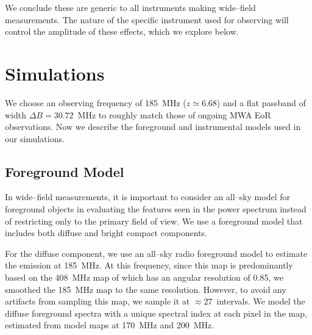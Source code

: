 \documentclass[preprint2,iop,numberedappendix]{emulateapj}
\begin{document}
We conclude these are generic to all instruments making wide--field measurements. The nature of the specific instrument used for observing will control the amplitude of these effects, which we explore below. 

\section{Simulations}\label{sec:sim}

We choose an observing frequency of 185~MHz ($z\simeq 6.68$) and a flat passband of width $\Delta B = 30.72$~MHz to roughly match those of ongoing MWA EoR observations. Now we describe the foreground and instrumental models used in our simulations. 

\subsection{Foreground Model}\label{sec:foreground}

In wide--field measurements, it is important to consider an all--sky model for foreground objects in evaluating the features seen in the power spectrum instead of restricting only to the primary field of view. We use a foreground model that includes both diffuse and bright compact components.  


For the diffuse component, we use an all--sky radio foreground model \citep{deo08} to estimate the emission at 185~MHz. At this frequency, since this map is predominantly based on the 408~MHz map of \citet{has82} which has an angular resolution of 0.85\arcdeg, we smoothed the 185~MHz map to the same resolution. However, to avoid any artifacts from sampling this map, we sample it at $\approx 27$\arcmin~intervals. We model the diffuse foreground spectra with a unique spectral index at each pixel in the map, estimated from model maps at 170~MHz and 200~MHz.

\end{document}
